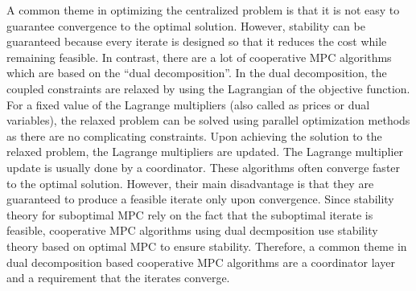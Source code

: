 \documentclass[10pt]{article}
\theoremstyle{definition}
\begin{document}
A common theme in optimizing the centralized  problem is
that it is not easy to guarantee convergence to the optimal
solution. However, stability can be guaranteed because every iterate
is designed so that it reduces the cost while remaining feasible. In
contrast, there are a lot of cooperative MPC algorithms which are
based on the ``dual decomposition''. In the dual decomposition, the
coupled constraints are relaxed by using the Lagrangian of the
objective function. For a fixed value of the Lagrange multipliers
(also called as prices or dual variables), the relaxed problem can be solved using
parallel optimization methods as there are no complicating
constraints. Upon achieving the solution to the relaxed problem, the
Lagrange multipliers are updated. The Lagrange multiplier update is
usually done by a coordinator. These algorithms often converge faster
to the optimal solution. However, their main disadvantage is that they
are guaranteed to produce a feasible iterate only upon
convergence. Since stability theory for suboptimal MPC rely on the
fact that the suboptimal iterate is feasible, cooperative MPC
algorithms using dual decmposition use stability theory based on
optimal MPC to ensure stability. Therefore, a common theme in dual
decomposition based cooperative MPC algorithms are a coordinator layer
and a requirement that the iterates converge. 
\end{document}
